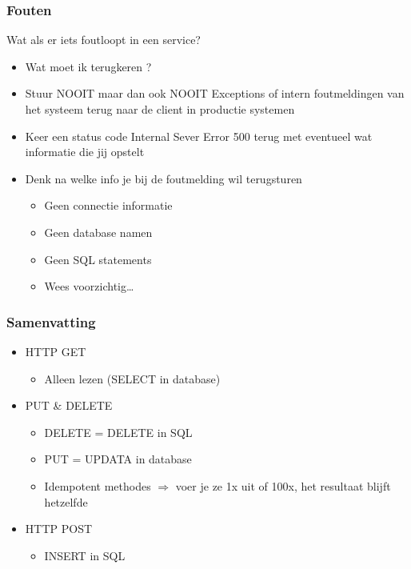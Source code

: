 \documentclass{article}
\begin{document}
\subsubsection{Fouten}
Wat als er iets foutloopt in een service?

\begin{itemize}
    \item Wat moet ik terugkeren ?
    \item Stuur NOOIT maar dan ook NOOIT Exceptions of intern foutmeldingen van het systeem terug naar de client in productie systemen
    \item Keer een status code Internal Sever Error 500 terug met eventueel wat informatie die jij opstelt
    \item Denk na welke info je bij de foutmelding wil terugsturen
    \begin{itemize}
        \item Geen connectie informatie
        \item Geen database namen
        \item Geen SQL statements
        \item Wees voorzichtig\dots
    \end{itemize}
\end{itemize}

\subsubsection{Samenvatting}
\begin{itemize}
    \item HTTP GET
    \begin{itemize}
        \item Alleen lezen (SELECT in database)
    \end{itemize}
    \item PUT \& DELETE
    \begin{itemize}
        \item DELETE = DELETE in SQL
        \item PUT = UPDATA in database
        \item Idempotent methodes $\Rightarrow$ voer je ze 1x uit of 100x, het resultaat blijft hetzelfde
    \end{itemize}
    \item HTTP POST
    \begin{itemize}
        \item INSERT in SQL
    \end{itemize}
\end{itemize}
\end{document}
